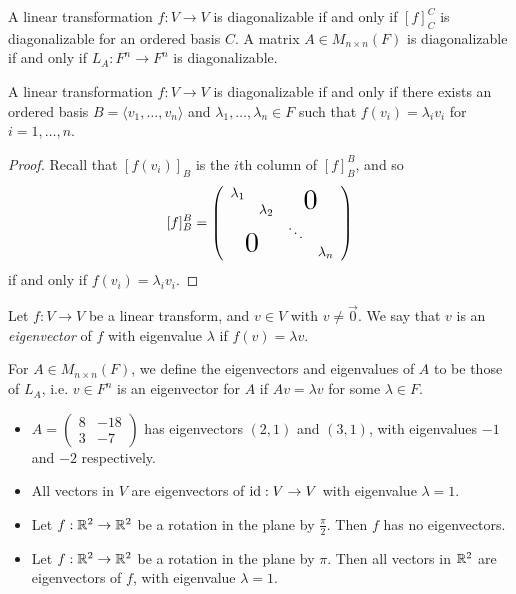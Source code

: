 \begin{rmk}
    A linear transformation $f: V \to V$ is diagonalizable if and only if $[f]_C^C$ is diagonalizable for an ordered basis $C$. A matrix $A \in M_{n \times n}(F)$ is diagonalizable if and only if $L_A: F^n \to F^n$ is diagonalizable.
\end{rmk}

\begin{lemma}\label{diagonalizable-eigenvectors}
    A linear transformation $f: V \to V$ is diagonalizable if and only if there exists an ordered basis $B = \langle v_1, \ldots, v_n\rangle$ and $\lambda_1, \ldots, \lambda_n \in F$ such that $f(v_i) = \lambda_iv_i$ for $i = 1, \ldots, n$.
\end{lemma}

\begin{proof}
    Recall that $[f(v_i)]_{B}$ is the $i$th column of $[f]_{B}^{B}$, and so
    \[[f]_{B}^{B} = \left(\begin{array}{cccc}
        \lambda_1 & & \largeblock{2}{-0.7}{0} \\
        & \lambda_2 & &  \\
        & & \ddots & \\
        \largeblock{2}{0.7}{0} & & \lambda_n \\
    \end{array}
    \right)\] if and only if $f(v_i) = \lambda_iv_i$.
\end{proof}

\begin{defn}
    Let $f: V \to V$ be a linear transform, and $v \in V$ with $v \neq \vec{0}$. We say that $v$ is an \emph{eigenvector} of $f$ with eigenvalue $\lambda$ if $f(v) = \lambda v$.

    For $A \in M_{n \times n}(F)$, we define the eigenvectors and eigenvalues of $A$ to be those of $L_A$, i.e. $v \in F^n$ is an eigenvector for $A$ if $Av = \lambda v$ for some $\lambda \in F$.
\end{defn}

\begin{exmp}\proofbreak
    \begin{itemize}
        \item $A = \begin{pmatrix}8 & -18 \\ 3 & -7\end{pmatrix}$ has eigenvectors $(2, 1)$ and $(3, 1)$, with eigenvalues $-1$ and $-2$ respectively.
        \item All vectors in $V$ are eigenvectors of $\operatorname{id}: V \to V$ with eigenvalue $\lambda = 1$.
        \item Let $f: \mathbb{R}^2 \to \mathbb{R}^2$ be a rotation in the plane by $\frac{\pi}{2}$. Then $f$ has no eigenvectors.
        \item Let $f: \mathbb{R}^2 \to \mathbb{R}^2$ be a rotation in the plane by $\pi$. Then all vectors in $\mathbb{R}^2$ are eigenvectors of $f$, with eigenvalue $\lambda = 1$.
    \end{itemize}
\end{exmp}

